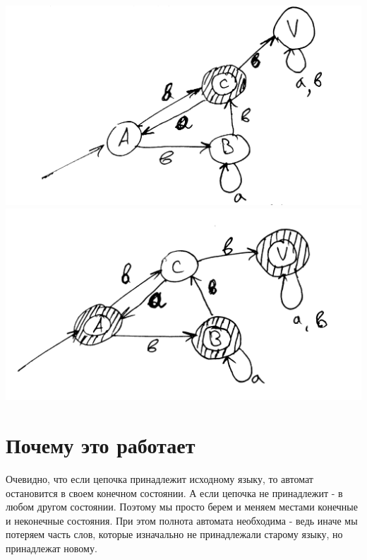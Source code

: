 \documentclass[14pt]{extreport}
\begin{document}
	\includegraphics[scale=0.1]{data/pic5_2.png}\includegraphics[scale=0.12]{data/pic5_3.png}\\
	\section{Почему это работает}
	Очевидно, что если цепочка принадлежит исходному языку, то автомат остановится в своем
	конечном состоянии. А если цепочка не принадлежит - в любом другом состоянии. Поэтому мы
	просто берем и меняем местами конечные и неконечные состояния. При этом полнота автомата
	необходима - ведь иначе мы потеряем часть слов, которые изначально не принадлежали старому
	языку, но принадлежат новому.
\end{document}

